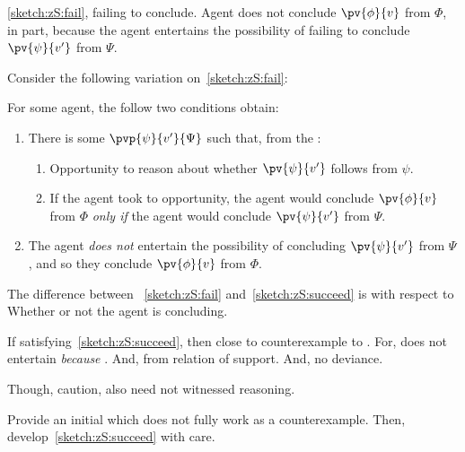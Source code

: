 \begin{note}
  \autoref{sketch:zS:fail}, failing to conclude.
  Agent does not conclude \(\pv{\phi}{v}\) from \(\Phi\), in part, because the agent entertains the possibility of failing to conclude \(\pv{\psi}{v'}\) from \(\Psi\).

  Consider the following variation on~\autoref{sketch:zS:fail}:
  \begin{sketch}
    \label{sketch:zS:succeed}
    For some agent, the follow two conditions obtain:
    \begin{enumerate}
    \item
      \label{sketch:zS:succeed:curb}
      There is some \(\pvp{\psi}{v'}{\Psi}\) such that, from the \agpe{}:
      \begin{enumerate}[label=\alph*., ref=(\alph*)]
      \item
        \label{sketch:zS:succeed:curb:opportunity}
        Opportunity to reason about whether \(\pv{\psi}{v'}\) follows from \(\psi\).
      \item
        \label{sketch:zS:succeed:curb:conditional}
        If the agent took to opportunity, the agent would conclude \(\pv{\phi}{v}\) from \(\Phi\) \emph{only if} the agent would conclude \(\pv{\psi}{v'}\) from \(\Psi\).
      \end{enumerate}
    \item
      \label{sketch:zS:succeed:no-c}
      The agent \emph{does not} entertain the possibility of concluding \(\pv{\psi}{v'}\) from \(\Psi\), and so they conclude \(\pv{\phi}{v}\) from \(\Phi\).
    \end{enumerate}%
    \vspace{-\baselineskip}
  \end{sketch}

  The difference between ~\ref{sketch:zS:fail} and~\ref{sketch:zS:succeed} is with respect to {\color{red} Whether or not the agent is concluding}.
\end{note}

\begin{note}
  If  satisfying~\autoref{sketch:zS:succeed}, then close to counterexample to \issueConstraint{}.
  For, does not entertain \emph{because} \fc{}.
  And, from  \fc{} relation of support.
  And, no deviance.

  Though, caution, also need not witnessed reasoning.

  Provide an initial \scen{} which does not fully work as a counterexample.
  Then, develop~\autoref{sketch:zS:succeed} with care.
\end{note}


